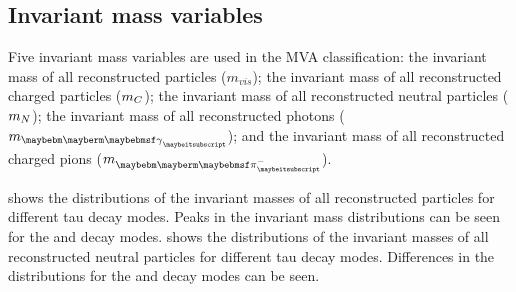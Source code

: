 
\subsection{Invariant mass variables}

Five invariant mass variables are used in the MVA classification: the invariant mass of all reconstructed particles ($m_{vis}$); the invariant mass of all reconstructed charged particles ($m_{C}$); the invariant mass of all reconstructed neutral particles ($m_{N}$); the invariant mass of all reconstructed photons ($m_{\Pgg}$); and the invariant mass of all reconstructed  charged pions ($m_{\Pgpm}$).

 shows the distributions of the invariant masses of all reconstructed particles  for different tau decay modes. Peaks in the invariant mass distributions can be seen for the \Prho and \Pai decay modes.  shows the distributions of the invariant masses of all reconstructed neutral particles  for different tau decay modes. Differences in the distributions for  the \Prho and \Pai decay modes can be seen.






